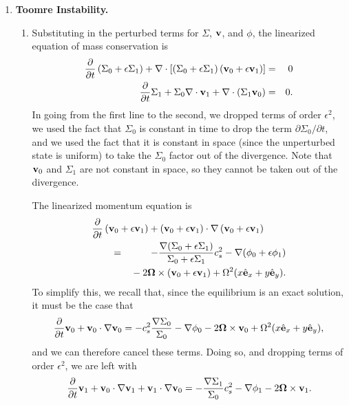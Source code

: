 \solutionset

\begin{enumerate}

\item \textbf{Toomre Instability.}

\begin{enumerate}

\item Substituting in the perturbed terms for $\Sigma$, $\mathbf{v}$, and $\phi$, the linearized equation of mass conservation is
\begin{eqnarray*}
\frac{\partial}{\partial t}\left(\Sigma_0 + \epsilon \Sigma_1\right) + 
\nabla \cdot \left[\left(\Sigma_0 + \epsilon \Sigma_1\right) \left(\mathbf{v}_0 + \epsilon \mathbf{v}_1\right)\right] & = & 0 \\
\frac{\partial}{\partial t} \Sigma_1 + \Sigma_0 \nabla \cdot  \mathbf{v}_1 + \nabla \cdot \left(\Sigma_1 \mathbf{v}_0\right) & = & 0.
\end{eqnarray*}
In going from the first line to the second, we dropped terms of order $\epsilon^2$, we used the fact that $\Sigma_0$ is constant in time to drop the term $\partial\Sigma_0/\partial t$, and we used the fact that it is constant in space (since the unperturbed state is uniform) to take the $\Sigma_0$ factor out of the divergence. Note that $\mathbf{v}_0$ and $\Sigma_1$ are not constant in space, so they cannot be taken out of the divergence.

The linearized momentum equation is
\begin{eqnarray*}
\lefteqn{\frac{\partial}{\partial t}\left(\vecv_0 + \epsilon \vecv_1\right) + \left(\vecv_0 + \epsilon \vecv_1\right)\cdot \nabla\left(\vecv_0 + \epsilon \vecv_1\right)} \qquad \\
 & = & -\frac{\nabla (\Sigma_0+\epsilon \Sigma_1)}{\Sigma_0+\epsilon\Sigma_1} c_s^2 - \nabla (\phi_0 + \epsilon\phi_1)
\nonumber \\
& & {}
- 2\veco \times \left(\vecv_0 + \epsilon \vecv_1\right) + \Omega^2 (x \ehat_x + y \ehat_y). \\
\end{eqnarray*}
To simplify this, we recall that, since the equilibrium is an exact solution, it must be the case that
\begin{displaymath}
\frac{\partial}{\partial t} \mathbf{v}_0 + \mathbf{v}_0 \cdot \nabla \mathbf{v}_0 = -c_s^2 \frac{\nabla\Sigma_0}{\Sigma_0} - \nabla \phi_0 - 2{\bm \Omega}\times\mathbf{v}_0 + \Omega^2 (x \hat{\mathbf{e}}_x + y \hat{\mathbf{e}}_y),
\end{displaymath}
and we can therefore cancel these terms. Doing so, and dropping terms of order $\epsilon^2$, we are left with
\begin{displaymath}
\frac{\partial}{\partial t} \mathbf{v}_1 + \mathbf{v}_0 \cdot\nabla \mathbf{v}_1 + \mathbf{v}_1 \cdot \nabla \mathbf{v}_0
= - \frac{\nabla \Sigma_1}{\Sigma_0} c_s^2 - \nabla \phi_1- 2  {\bm \Omega}\times\mathbf{v}_1.
\end{displaymath}


\end{enumerate}
\end{enumerate}
